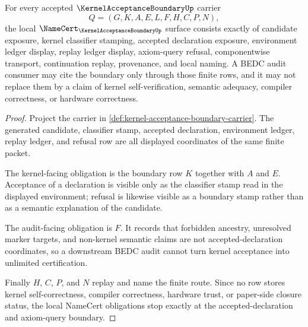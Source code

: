 \begin{theorem}
\label{thm:kernel-acceptance-boundary-namecert-obligations}
For every accepted $\KernelAcceptanceBoundaryUp$ carrier
$$
Q=(G,K,A,E,L,F,H,C,P,N),
$$
the local $\NameCert_{\KernelAcceptanceBoundaryUp}$ surface consists exactly of candidate exposure, kernel classifier stamping, accepted declaration exposure, environment ledger display, replay ledger display, axiom-query refusal, componentwise transport, continuation replay, provenance, and local naming. A BEDC audit consumer may cite the boundary only through those finite rows, and it may not replace them by a claim of kernel self-verification, semantic adequacy, compiler correctness, or hardware correctness.
\end{theorem}
\begin{proof}
Project the carrier in \autoref{def:kernel-acceptance-boundary-carrier}. The generated candidate, classifier stamp, accepted declaration, environment ledger, replay ledger, and refusal row are all displayed coordinates of the same finite packet.

The kernel-facing obligation is the boundary row $K$ together with $A$ and $E$. Acceptance of a declaration is visible only as the classifier stamp read in the displayed environment; refusal is likewise visible as a boundary stamp rather than as a semantic explanation of the candidate.

The audit-facing obligation is $F$. It records that forbidden ancestry, unresolved marker targets, and non-kernel semantic claims are not accepted-declaration coordinates, so a downstream BEDC audit cannot turn kernel acceptance into unlimited certification.

Finally $H$, $C$, $P$, and $N$ replay and name the finite route. Since no row stores kernel self-correctness, compiler correctness, hardware trust, or paper-side closure status, the local NameCert obligations stop exactly at the accepted-declaration and axiom-query boundary.
\end{proof}

